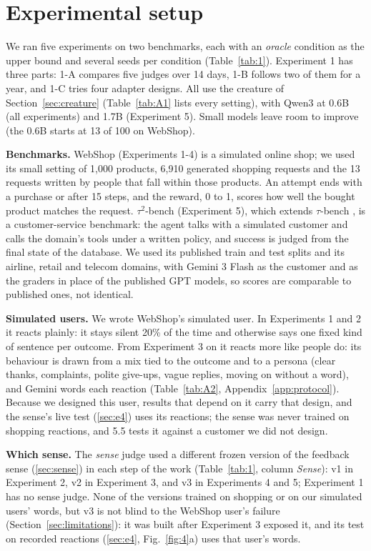 \section{Experimental setup}\label{sec:setup}

We ran five experiments on two benchmarks, each with an \emph{oracle} condition as the upper bound and several seeds per condition (Table~\ref{tab:1}). Experiment 1 has three parts: 1-A compares five judges over 14 days, 1-B follows two of them for a year, and 1-C tries four adapter designs. All use the creature of Section~\ref{sec:creature} (Table~\ref{tab:A1} lists every setting), with Qwen3 at 0.6B (all experiments) and 1.7B (Experiment 5). Small models leave room to improve (the 0.6B starts at 13 of 100 on WebShop).

\textbf{Benchmarks.} WebShop \cite{yao2022webshop} (Experiments 1-4) is a simulated online shop; we used its small setting of 1,000 products, 6,910 generated shopping requests and the 13 requests written by people that fall within those products. An attempt ends with a purchase or after 15 steps, and the reward, 0 to 1, scores how well the bought product matches the request. $\tau^2$-bench \cite{barres2026tau2} (Experiment 5), which extends $\tau$-bench \cite{yao2025taubench}, is a customer-service benchmark: the agent talks with a simulated customer and calls the domain's tools under a written policy, and success is judged from the final state of the database. We used its published train and test splits and its airline, retail and telecom domains, with Gemini 3 Flash as the customer and as the graders in place of the published GPT models, so scores are comparable to published ones, not identical.

\textbf{Simulated users.} We wrote WebShop's simulated user. In Experiments 1 and 2 it reacts plainly: it stays silent 20\% of the time and otherwise says one fixed kind of sentence per outcome. From Experiment 3 on it reacts more like people do: its behaviour is drawn from a mix tied to the outcome and to a persona (clear thanks, complaints, polite give-ups, vague replies, moving on without a word), and Gemini words each reaction (Table~\ref{tab:A2}, Appendix~\ref{app:protocol}). Because we designed this user, results that depend on it carry that design, and the sense's live test (\ref{sec:e4}) uses its reactions; the sense was never trained on shopping reactions, and 5.5 tests it against a customer we did not design.

\textbf{Which sense.} The \emph{sense} judge used a different frozen version of the feedback sense (\ref{sec:sense}) in each step of the work (Table~\ref{tab:1}, column \emph{Sense}): v1 in Experiment 2, v2 in Experiment 3, and v3 in Experiments 4 and 5; Experiment 1 has no sense judge. None of the versions trained on shopping or on our simulated users' words, but v3 is not blind to the WebShop user's failure (Section~\ref{sec:limitations}): it was built after Experiment 3 exposed it, and its test on recorded reactions (\ref{sec:e4}, Fig.~\ref{fig:4}a) uses that user's words.

